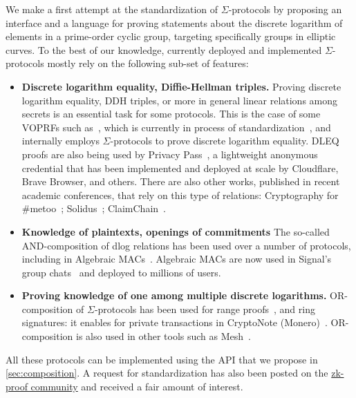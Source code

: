 \documentclass[runningheads]{llncs}
\begin{document}
We make a first attempt at the standardization of $\Sigma$-protocols by proposing an interface and a language for proving statements about the discrete logarithm of elements in a prime-order cyclic group, targeting specifically groups in elliptic curves. To the best of our knowledge, currently deployed and implemented $\Sigma$-protocols mostly rely on the following sub-set of features:

\begin{itemize}
  \item \textbf{Discrete logarithm equality, Diffie-Hellman triples.}
  Proving discrete logarithm equality, DDH triples, or more in general linear relations among secrets is an essential task for some protocols. This is the case of some VOPRFs such as~\cite{AC:JarKiaKra14},
  which is currently in process of standardization~\cite{cfrg-voprf}, and internally employs $\Sigma$-protocols to prove discrete logarithm equality.
  DLEQ proofs are also being used by Privacy Pass~\cite{PoPETS:DGSTV18}, a lightweight anonymous credential that has been implemented and deployed at scale by Cloudflare, Brave
  Browser, and others.
  There are also other works, published in recent academic conferences, that rely on this type of relations: Cryptography for \#metoo~\cite{PoPETS:KuyKraRab19}; Solidus~\cite{CCS:CZJKJS17}; ClaimChain~\cite{ClaimChain}.
  \item \textbf{Knowledge of plaintexts, openings of commitments}
  The so-called AND-composition of dlog relations has been used over a number of protocols,
  including in Algebraic MACs~\cite{CCS:ChaMeiZav14}.
  Algebraic MACs are now used in Signal's group chats~\cite{CCS:ChaPerZav20} and deployed to millions of users.
  \item \textbf{Proving knowledge of one among multiple discrete logarithms.}
  OR-composition of $\Sigma$-protocols
  has been used for range proofs~\cite{borromeansig}, and ring signatures: it enables for private transactions in CryptoNote (Monero)~\cite{monero}.
  OR-composition is also used in other tools such as Mesh~\cite{PoPETS:AlTGon19}.
\end{itemize}


All these protocols can be implemented using the API that we propose in \cref{sec:composition}.
A request for standardization has also been posted on the \href{https://community.zkproof.org/t/standardizing-sigma-protocols/471/}{zk-proof community} and received a fair amount of interest.
\end{document}
